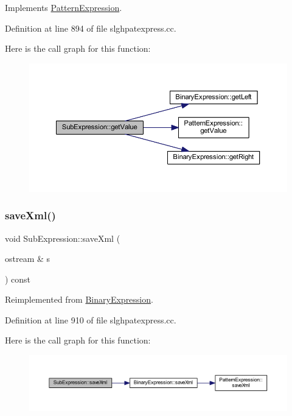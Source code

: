 Implements \mbox{\hyperlink{class_pattern_expression_a8332c6ea4c5a7e9dfc690df2a6458bb8}{Pattern\+Expression}}.



Definition at line 894 of file slghpatexpress.\+cc.

Here is the call graph for this function\+:
\nopagebreak
\begin{figure}[H]
\begin{center}
\leavevmode
\includegraphics[width=350pt]{class_sub_expression_a1c565bff8bbdc848b03c49818d13b4a6_cgraph}
\end{center}
\end{figure}
\mbox{\label{class_sub_expression_ad928f4c50f72f0c16872aad6071a4387}} 
\subsubsection{\texorpdfstring{saveXml()}{saveXml()}}
{\footnotesize\ttfamily void Sub\+Expression\+::save\+Xml (\begin{DoxyParamCaption}\item[{ostream \&}]{s }\end{DoxyParamCaption}) const\hspace{0.3cm}{\ttfamily [virtual]}}



Reimplemented from \mbox{\hyperlink{class_binary_expression_a4b9e768a619b713d6c1ff35a618d98ec}{Binary\+Expression}}.



Definition at line 910 of file slghpatexpress.\+cc.

Here is the call graph for this function\+:
\nopagebreak
\begin{figure}[H]
\begin{center}
\leavevmode
\includegraphics[width=350pt]{class_sub_expression_ad928f4c50f72f0c16872aad6071a4387_cgraph}
\end{center}
\end{figure}


